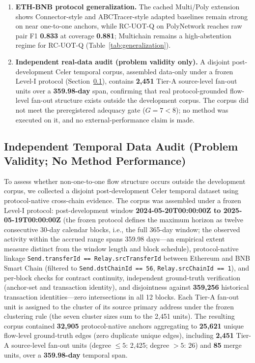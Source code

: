 \begin{enumerate}
\item \textbf{ETH-BNB protocol generalization.} The cached Multi/Poly extension shows Connector-style and ABCTracer-style adapted baselines remain strong on near one-to-one anchors, while RC-UOT-Q on PolyNetwork reaches raw pair F1 \textbf{0.833} at coverage \textbf{0.881}; Multichain remains a high-abstention regime for RC-UOT-Q (Table~\ref{tab:generalization}).
\item \textbf{Independent real-data audit (problem validity only).} A disjoint post-development Celer temporal corpus, assembled data-only under a frozen Level-I protocol (Section~\ref{sec:v4audit}), contains \textbf{2{,}451} Tier-A source-level fan-out units over a \textbf{359.98-day} span, confirming that real protocol-grounded flow-level fan-out structure exists outside the development corpus. The corpus did not meet the preregistered adequacy gate ($G = 7 < 8$); no method was executed on it, and no external-performance claim is made.
\end{enumerate}

\subsection{Independent Temporal Data Audit (Problem Validity; No Method Performance)}
\label{sec:v4audit}

To assess whether non-one-to-one flow structure occurs outside the development corpus, we collected a disjoint post-development Celer temporal dataset using protocol-native cross-chain evidence. The corpus was assembled under a frozen Level-I protocol: post-development window \textbf{2024-05-20T00:00:00Z to 2025-05-19T00:00:00Z} (the frozen protocol defines the maximum horizon as twelve consecutive 30-day calendar blocks, i.e., the full 365-day window; the observed activity within the accrued range spans 359.98 days---an empirical extent measure distinct from the window length and block schedule), protocol-native linkage \texttt{Send.transferId == Relay.srcTransferId} between Ethereum and BNB Smart Chain (filtered to \texttt{Send.dstChainId == 56}, \texttt{Relay.srcChainId == 1}), and per-block checks for contract continuity, independent ground-truth verification (anchor-set and transaction identity), and disjointness against \textbf{359{,}256} historical transaction identities---zero intersections in all 12 blocks. Each Tier-A fan-out unit is assigned to the cluster of its source primary address under the frozen clustering rule (the seven cluster sizes sum to the 2{,}451 units). The resulting corpus contained \textbf{32{,}905} protocol-native anchors aggregating to \textbf{25{,}621} unique flow-level ground-truth edges (zero duplicate unique edges), including \textbf{2{,}451} Tier-A source-level fan-out units (degree $\le 5$: 2{,}425; degree $>5$: 26) and \textbf{85} merge units, over a \textbf{359.98-day} temporal span.

